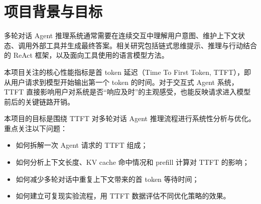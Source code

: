 \section{项目背景与目标}

多轮对话 Agent 推理系统通常需要在连续交互中理解用户意图、维护上下文状态、调用外部工具并生成最终答案。相关研究包括链式思维提示、推理与行动结合的 ReAct 框架，以及面向工具使用的语言模型方法\cite{wei2022chain,yao2023react,schick2023toolformer}。

本项目关注的核心性能指标是首 token 延迟（Time To First Token, TTFT），即从用户请求到模型开始输出第一个 token 的时间。对于交互式 Agent 系统，TTFT 直接影响用户对系统是否“响应及时”的主观感受，也能反映请求进入模型前后的关键链路开销。

本项目的目标是围绕 TTFT 对多轮对话 Agent 推理流程进行系统性分析与优化。重点关注以下问题：

\begin{itemize}
  \item 如何拆解一次 Agent 请求的 TTFT 组成；
  \item 如何分析上下文长度、KV cache 命中情况和 prefill 计算对 TTFT 的影响；
  \item 如何减少多轮对话中重复上下文带来的首 token 等待时间；
  \item 如何建立可复现实验流程，用 TTFT 数据评估不同优化策略的效果。
\end{itemize}
